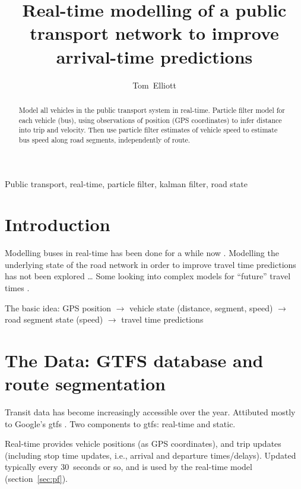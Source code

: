 \documentclass[draftcls,a4paper,onecolumn]{IEEEtran}\usepackage[]{graphicx}\usepackage[]{color}
\title{Real-time modelling of a public transport network to improve arrival-time predictions}
\author{Tom~Elliott}
\begin{document}
\maketitle


\begin{abstract}
  Model all vehicles in the public transport system in real-time.
  Particle filter model for each vehicle (bus),
  using observations of position (GPS coordinates) to infer distance into trip
  and velocity.
  Then use particle filter estimates of vehicle speed to estimate bus speed along
  road segments, independently of route.
 
\end{abstract}



\begin{IEEEkeywords}
  Public transport, real-time, particle filter, kalman filter, road state
\end{IEEEkeywords}

\section{Introduction}
\label{sec:intro}


Modelling buses in real-time has been done for a while now 
\cite{Cats_2015,Chen_2014,Hans_2015,Jeong_2005,TCRP_2003,Wessel_2016,
  Xinghao_2013}.
Modelling the underlying state of the road network in order to improve 
travel time predictions has not been explored \ldots
Some looking into complex models for ``future'' travel times 
\cite{Julio_2016,Xinghao_2013,Yichen_Zheng_2016,Yu_2011}.


The basic idea:
GPS position $\rightarrow$ 
vehicle state (distance, segment, speed) $\rightarrow$
road segment state (speed) $\rightarrow$
travel time predictions



\section{The Data: GTFS database and route segmentation}
\label{sec:data}

Transit data has become increasingly accessible over the year.
Attibuted mostly to Google's \gls{gtfs} \cite{GoogleDevelopers_2006}.
Two components to \gls{gtfs}: real-time and static.

Real-time provides vehicle positions (as GPS coordinates),
and trip updates (including stop time updates, 
i.e., arrival and departure times/delays).
Updated typically every 30~seconds or so,
and is used by the real-time model (section~\ref{sec:pf}).
\end{document}
